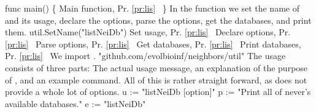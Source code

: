 func main() \{
          \LA{}Main function, Pr. \ref{pr:lis}~{\nwtagstyle{}}\RA{}
\}
\nwendcode{}\nwdocspar
\epr In the  function we set the name of  and its
usage, declare the options, parse the options, get the databases, and
print them.
\nwenddocs{}\endmoddef\nwstartdeflinemarkup{}\nwenddeflinemarkup
util.SetName("listNeiDb")
\LA{}Set usage, Pr. \ref{pr:lis}~{\nwtagstyle{}}\RA{}
\LA{}Declare options, Pr. \ref{pr:lis}~{\nwtagstyle{}}\RA{}
\LA{}Parse options, Pr. \ref{pr:lis}~{\nwtagstyle{}}\RA{}
\LA{}Get databases, Pr. \ref{pr:lis}~{\nwtagstyle{}}\RA{}
\LA{}Print databases, Pr. \ref{pr:lis}~{\nwtagstyle{}}\RA{}
\nwendcode{}\nwdocspar
We import .
\nwenddocs{}\endmoddef\nwstartdeflinemarkup{}\nwenddeflinemarkup
"github.com/evolbioinf/neighbors/util"
\nwendcode{}\nwdocspar
The usage consists of three parts: The actual usage message, an
explanation of the purpose of , and an example command.
All of this is rather straight forward, as  does not provide
a whole lot of options.
\nwenddocs{}\endmoddef\nwstartdeflinemarkup{}\nwenddeflinemarkup
u := "listNeiDb [option]"
p := "Print all of never's available databases."
e := "listNeiDb"
